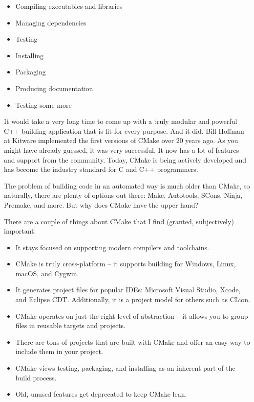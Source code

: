 \begin{itemize}
\item 
Compiling executables and libraries

\item 
Managing dependencies

\item 
Testing

\item 
Installing

\item 
Packaging

\item 
Producing documentation

\item 
Testing some more
\end{itemize}

It would take a very long time to come up with a truly modular and powerful C++ building application that is fit for every purpose. And it did. Bill Hoffman at Kitware implemented the first versions of CMake over 20 years ago. As you might have already guessed, it was very successful. It now has a lot of features and support from the community. Today, CMake is being actively  developed and has become the industry standard for C and C++ programmers.

The problem of building code in an automated way is much older than CMake, so naturally, there are plenty of options out there: Make, Autotools, SCons, Ninja, Premake, and more. But why does CMake have the upper hand?

There are a couple of things about CMake that I find (granted, subjectively) important:

\begin{itemize}
\item 
It stays focused on supporting modern compilers and toolchains.

\item 
CMake is truly cross-platform – it supports building for Windows, Linux, macOS, and Cygwin.

\item 
It generates project files for popular IDEs: Microsoft Visual Studio, Xcode, and Eclipse CDT. Additionally, it is a project model for others such as CLion.

\item 
CMake operates on just the right level of abstraction – it allows you to group files in reusable targets and projects.

\item 
There are tons of projects that are built with CMake and offer an easy way to include them in your project.

\item 
CMake views testing, packaging, and installing as an inherent part of the build process.

\item 
Old, unused features get deprecated to keep CMake lean.
\end{itemize}

